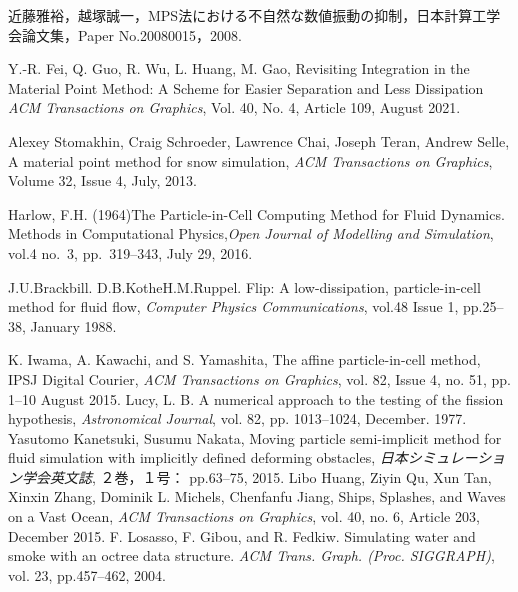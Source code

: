 \documentclass[a4j,12pt]{jreport}
\begin{document}
\begin{thebibliography}{99}

近藤雅裕，越塚誠一，MPS法における不自然な数値振動の抑制，日本計算工学会論文集，Paper No.20080015，2008. 

Y.-R. Fei, Q. Guo, R. Wu, L. Huang, M. Gao, Revisiting Integration in the Material Point Method: A Scheme for Easier Separation and Less Dissipation \textit{ACM Transactions on Graphics}, Vol. 40, No. 4, Article 109, August 2021.

Alexey Stomakhin, Craig Schroeder, Lawrence Chai, Joseph Teran, Andrew Selle, A material point method for snow simulation, \textit{ACM Transactions on Graphics},  Volume 32, Issue 4, July, 2013.

Harlow, F.H. (1964)The Particle-in-Cell Computing Method for Fluid Dynamics. Methods in Computational Physics,\textit{Open Journal of Modelling and Simulation},  vol.4 no.~3, pp.~319--343, July 29, 2016.

J.U.Brackbill. D.B.KotheH.M.Ruppel. Flip: A low-dissipation, particle-in-cell method for fluid flow, \textit{Computer Physics Communications}, vol.48 Issue 1, pp.25--38, January 1988.

K. Iwama, A. Kawachi, and S. Yamashita, The affine particle-in-cell method, IPSJ Digital Courier, \textit{ACM Transactions on Graphics}, vol. 82, Issue 4, no. 51, pp. 1--10 August 2015.
Lucy, L. B. A numerical approach to the testing of the fission hypothesis, \textit{Astronomical Journal}, vol. 82, pp. 1013--1024, December. 1977.
Yasutomo Kanetsuki, Susumu Nakata, Moving particle semi-implicit method for fluid simulation with implicitly defined deforming obstacles, \textit{日本シミュレーション学会英文誌}, ２巻，１号： pp.63--75, 2015.
Libo Huang, Ziyin Qu, Xun Tan, Xinxin Zhang, Dominik L. Michels, Chenfanfu Jiang, Ships, Splashes, and Waves on a Vast Ocean, \textit{ACM Transactions on Graphics}, vol. 40, no. 6, Article 203, December 2015. 
F. Losasso, F. Gibou, and R. Fedkiw. Simulating water and smoke with an octree data structure. \textit{ACM Trans. Graph. (Proc. SIGGRAPH)}, vol. 23, pp.457--462, 2004.
\end{thebibliography}

\end{document}
